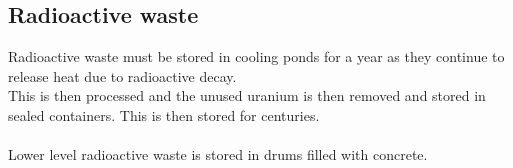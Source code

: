 \documentclass{article}[18pt]
\begin{document}
\subsection{Radioactive waste}
Radioactive waste must be stored in cooling ponds for a year as they continue to release heat due to radioactive decay.\\
This is then processed and the unused uranium is then removed and stored in sealed containers. This is then stored for centuries.\\
\\
Lower level radioactive waste is stored in drums filled with concrete.
\end{document}
